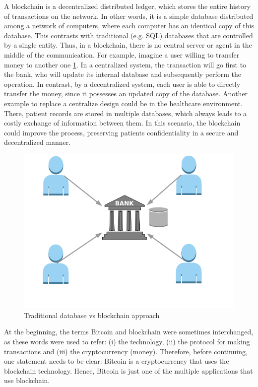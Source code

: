 A blockchain is a decentralized distributed ledger, which stores the entire history of transactions on the network. In other words, it is a simple database distributed among a network of computers, where each computer has an identical copy of this database. This contrasts with traditional (e.g. SQL) databases that are controlled by a single entity. Thus, in a blockchain, there is no central server or agent in the middle of the communication. For example, imagine a user willing to transfer money to another one \ref{fig:CentralizedvsDecentralized}. In a centralized system, the transaction will go first to the bank, who will update its internal database and subsequently perform the operation. In contrast, by a decentralized system, each user is able to directly transfer the money, since it possesses an updated copy of the database. Another example to replace a centralize design could be in the healthcare environment. There, patient records are stored in multiple databases, which always leads to a costly exchange of information between them. In this scenario, the blockchain could improve the process, preserving patients confidentiality in a secure and decentralized manner.

\begin{figure}[bth]
	\centering
	\includegraphics[width=0.8\linewidth]{gfx/cenVsDec}    
  	\caption{Traditional database vs blockchain approach}
  	\label{fig:CentralizedvsDecentralized}
\end{figure}

At the beginning, the terms Bitcoin and blockchain were sometimes interchanged, as these words were used to refer: (i) the technology, (ii) the protocol for making transactions and (iii) the cryptocurrency (money). Therefore, before continuing, one statement needs to be clear: Bitcoin is a cryptocurrency that uses the blockchain technology. Hence, Bitcoin is just one of the multiple applications that use blockchain. 

